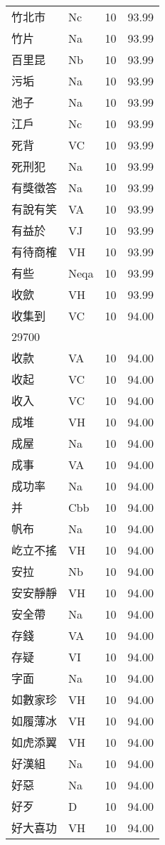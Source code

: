 \documentclass[twocolumn]{book}
\begin{document}
\begin{supertabular}{llrr}
竹北市 & Nc & 10 &  93.99\\
竹片 & Na & 10 &  93.99\\
百里昆 & Nb & 10 &  93.99\\
污垢 & Na & 10 &  93.99\\
池子 & Na & 10 &  93.99\\
江戶 & Nc & 10 &  93.99\\
死背 & VC & 10 &  93.99\\
死刑犯 & Na & 10 &  93.99\\
有獎徵答 & Na & 10 &  93.99\\
有說有笑 & VA & 10 &  93.99\\
有益於 & VJ & 10 &  93.99\\
有待商榷 & VH & 10 &  93.99\\
有些 & Neqa & 10 &  93.99\\
收歛 & VH & 10 &  93.99\\
收集到 & VC & 10 &  94.00\\
29700\\
收款 & VA & 10 &  94.00\\
收起 & VC & 10 &  94.00\\
收入 & VC & 10 &  94.00\\
成堆 & VH & 10 &  94.00\\
成屋 & Na & 10 &  94.00\\
成事 & VA & 10 &  94.00\\
成功率 & Na & 10 &  94.00\\
并 & Cbb & 10 &  94.00\\
帆布 & Na & 10 &  94.00\\
屹立不搖 & VH & 10 &  94.00\\
安拉 & Nb & 10 &  94.00\\
安安靜靜 & VH & 10 &  94.00\\
安全帶 & Na & 10 &  94.00\\
存錢 & VA & 10 &  94.00\\
存疑 & VI & 10 &  94.00\\
字面 & Na & 10 &  94.00\\
如數家珍 & VH & 10 &  94.00\\
如履薄冰 & VH & 10 &  94.00\\
如虎添翼 & VH & 10 &  94.00\\
好漢組 & Na & 10 &  94.00\\
好惡 & Na & 10 &  94.00\\
好歹 & D & 10 &  94.00\\
好大喜功 & VH & 10 &  94.00\\

\end{supertabular}
\end{document}
